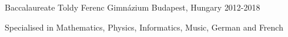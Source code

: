 

\begin{cventries}

  \cventry
    {Baccalaureate} %
    {Toldy Ferenc Gimnázium} %
    {Budapest, Hungary} %
    {2012-2018} %
    {
      \begin{cvitems} %
        \item {Specialised in Mathematics, Physics, Informatics, Music, German and French}
      \end{cvitems}
    }

\end{cventries}
